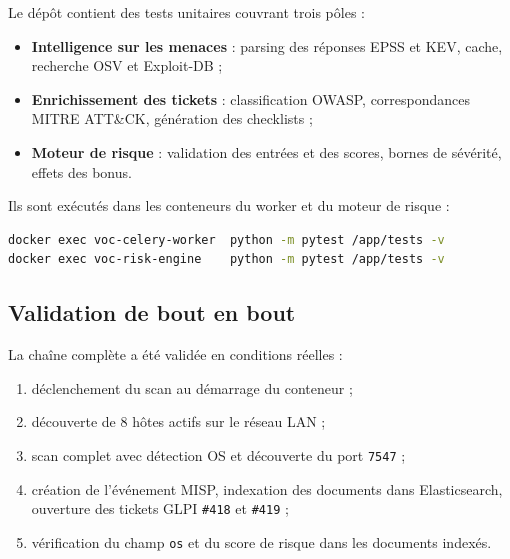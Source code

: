\documentclass[11pt,a4paper]{article}
\begin{document}
Le d\'ep\^ot contient des tests unitaires couvrant trois p\^oles :

\begin{itemize}[leftmargin=1.6em]
  \item \textbf{Intelligence sur les menaces} : parsing des r\'eponses EPSS
        et KEV, cache, recherche OSV et Exploit-DB ;
  \item \textbf{Enrichissement des tickets} : classification OWASP,
        correspondances MITRE ATT\&CK, g\'en\'eration des checklists ;
  \item \textbf{Moteur de risque} : validation des entr\'ees et des scores,
        bornes de s\'ev\'erit\'e, effets des bonus.
\end{itemize}

Ils sont ex\'ecut\'es dans les conteneurs du worker et du moteur de risque :

\begin{lstlisting}[language=bash,caption={Ex\'ecution des tests}]
docker exec voc-celery-worker  python -m pytest /app/tests -v
docker exec voc-risk-engine    python -m pytest /app/tests -v
\end{lstlisting}

\subsection{Validation de bout en bout}

La cha\^ine compl\`ete a \'et\'e valid\'ee en conditions r\'eelles :

\begin{enumerate}[leftmargin=1.6em]
  \item d\'eclenchement du scan au d\'emarrage du conteneur ;
  \item d\'ecouverte de 8 h\^otes actifs sur le r\'eseau LAN ;
  \item scan complet avec d\'etection OS et d\'ecouverte du port
        \texttt{7547} ;
  \item cr\'eation de l'\'ev\'enement MISP, indexation des documents dans
        Elasticsearch, ouverture des tickets GLPI \texttt{\#418} et
        \texttt{\#419} ;
  \item v\'erification du champ \texttt{os} et du score de risque dans les
        documents index\'es.
\end{enumerate}

\clearpage

\end{document}
